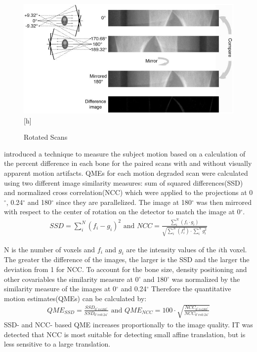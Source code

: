 \documentclass[
a4paper, 
12pt,
grayscalebody, %
abstract=on,
twoside, BCOR10mm, 12pt, DIV13,headinclude, footexclude, final, abstracton, openright
]{ibireprt}
\numberwithin{equation}{chapter}
\numberwithin{table}{chapter}
\numberwithin{figure}{chapter}
\numberwithin{algorithm}{chapter}
\numberwithin{example}{chapter}
\numberwithin{example}{chapter}
\begin{document}
\begin{figure}[h]
	\center
	\includegraphics[width = 1 \textwidth]{Sode_rotated_scan.png}[h]%
	\caption{Rotated Scans}
	\label{figure:fig2}
\end{figure}
\cite{Sode2011} introduced a technique to measure the subject motion based on a calculation of the percent  difference in each bone for the paired scans with and without visually apparent motion artifacts. QMEs for each motion degraded scan were calculated using two different image similarity measures: sum of squared differences(SSD) and normalized cross correlation(NCC) which were applied to the projections at 0$^{\circ}$, 0.24$^{\circ}$ and 180$^{\circ}$ since they are  parallelized. The image at 180$^{\circ}$ was then mirrored with respect to the center of rotation on the detector to match the image at 0$^{\circ}$. 
\begin{align}
	SSD = \sum_{i}^{N}(f_i-g_i)^2 \textrm{ and }
	 NCC = \frac{\sum_{i}^{N}(f_i \cdot g_i)}{\sqrt{\sum_{i}^{N}(f_i^2) \cdot \sum_{i}^{N}g_i^2}}
\end{align}

N is the number of voxels and $f_i$ and $g_i$ are the intensity values of the $i$th voxel. The greater the difference of the images, the larger is the SSD and the larger the deviation from 1 for NCC. To account for the bone size, density positioning and other covariables the similarity measure at 0$^{\circ}$ and 180$^{\circ}$ was normalized by the similarity measure of the images at 0$^{\circ}$ and 0.24$^{\circ}$
Therefore the quantitative motion estimates(QMEs) can be calculated by: 
\begin{align}
	QME_{SSD}= \frac{SSD_{0^{\circ} vs 180^{\circ}}}{SSD_{0^{\circ} vs 0.24^{\circ}}} \textrm{ and }	QME_{NCC}=100 \cdot \sqrt{ \frac{NCC_{0^{\circ} vs 180^{\circ}}}{NCC_{0^{\circ} vs 0.24^{\circ}}}}
\end{align}
SSD- and NCC- based QME increases proportionally to the image quality. IT was detected that NCC is most suitable for detecting small affine translation, but is less sensitive to a large translation.%
\end{document}
